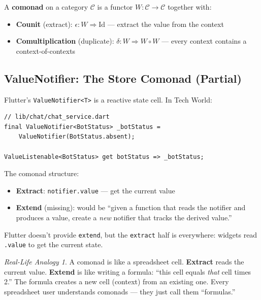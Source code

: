 \documentclass[12pt,a4paper]{article}
\theoremstyle{definition}
\theoremstyle{plain}
\theoremstyle{remark}
\newtheorem*{reallife}{Real-Life Analogy}
\begin{document}
\begin{formal}
A \textbf{comonad} on a category $\mathcal{C}$ is a functor
$W \colon \mathcal{C} \to \mathcal{C}$ together with:
\begin{itemize}
  \item \textbf{Counit} (extract): $\epsilon \colon W \Rightarrow \mathrm{Id}$
        --- extract the value from the context
  \item \textbf{Comultiplication} (duplicate):
        $\delta \colon W \Rightarrow W \circ W$
        --- every context contains a context-of-contexts
\end{itemize}
\end{formal}

\subsection{ValueNotifier: The Store Comonad (Partial)}

Flutter's \texttt{ValueNotifier<T>} is a reactive state cell. In Tech World:

\begin{lstlisting}
// lib/chat/chat_service.dart
final ValueNotifier<BotStatus> _botStatus =
    ValueNotifier(BotStatus.absent);

ValueListenable<BotStatus> get botStatus => _botStatus;
\end{lstlisting}

The comonad structure:
\begin{itemize}
  \item \textbf{Extract}: \texttt{notifier.value} --- get the current value
  \item \textbf{Extend} (missing): would be
        ``given a function that reads the notifier and produces a value,
        create a \emph{new} notifier that tracks the derived value.''
\end{itemize}

Flutter doesn't provide \texttt{extend}, but the \texttt{extract} half is
everywhere: widgets read \texttt{.value} to get the current state.

\begin{reallife}
A comonad is like a spreadsheet cell.
\textbf{Extract} reads the current value.
\textbf{Extend} is like writing a formula: ``this cell equals
\emph{that} cell times 2.'' The formula creates a new cell (context)
from an existing one.
Every spreadsheet user understands comonads --- they just call them
``formulas.''
\end{reallife}
\end{document}
